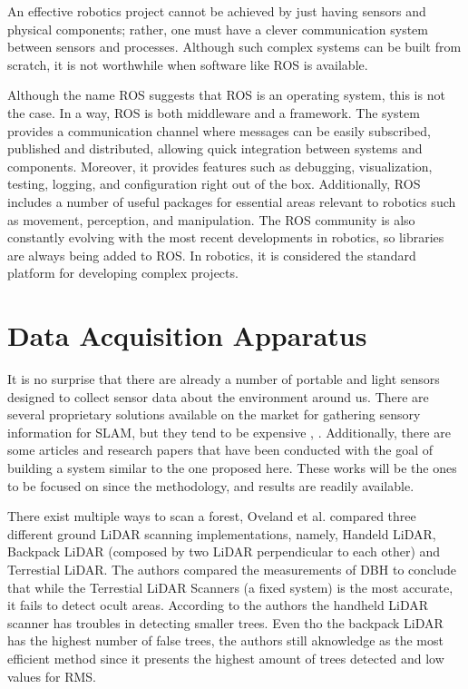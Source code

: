 An effective robotics project cannot be achieved by just having sensors and physical components; rather, one must have a clever communication system between sensors and processes. Although such complex systems can be built from scratch, it is not worthwhile when software like \acs*{ROS} is available.

Although the name \acl*{ROS} suggests that ROS is an operating system, this is not the case.  In a way, \acs*{ROS} is both middleware and a framework. The system provides a communication channel where messages can be easily subscribed, published and distributed, allowing quick integration between systems and components. Moreover, it provides features such as debugging, visualization, testing, logging, and configuration right out of the box. Additionally, ROS includes a number of useful packages for essential areas relevant to robotics such as movement, perception, and manipulation. The ROS community is also constantly evolving with the most recent developments in robotics, so libraries are always being added to ROS. In robotics, it is considered the standard platform for developing complex projects.


\section{Data Acquisition Apparatus}

It is no surprise that there are already a number of portable and light sensors designed to collect sensor data about the environment around us. There are several proprietary solutions available on the market for gathering sensory information for \acs*{SLAM}, but they tend to be expensive \cite{libackpack_C50}, \cite{libackpack_DGC50}. Additionally, there are some articles and research papers that have been conducted with the goal of building a system similar to the one proposed here. These works will be the ones to be focused on since the methodology, and results are readily available.

There exist multiple ways to scan a forest, Oveland et al. \cite{oveland_comparing_2018} compared three different ground LiDAR scanning implementations, namely, Handeld LiDAR, Backpack LiDAR (composed by two \acs*{LiDAR} perpendicular to each other) and Terrestial LiDAR. The authors compared the measurements of \acs*{DBH} to conclude that while the Terrestial LiDAR Scanners (a fixed system) is the most accurate, it fails to detect ocult areas. According to the authors the handheld LiDAR scanner has troubles in detecting smaller trees. Even tho the backpack LiDAR has the highest number of false trees, the authors still aknowledge as the most efficient method since it presents the highest amount of trees detected and low values for \acs*{RMS}.

